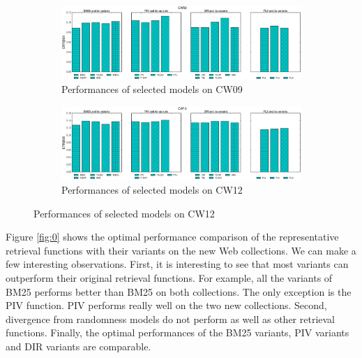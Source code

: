 \begin{figure}[t]
    \centering
    \caption{\label{fig:0}Optimal Performances on ClueWeb Collections}
    \begin{subfigure}[t]{1\textwidth}
        \includegraphics[width=\textwidth]{figures/CW09_bar.eps}
        \caption{Performances of selected models on CW09}
        \label{fig:cw09_bar}
    \end{subfigure}
    \begin{subfigure}[t]{1\textwidth}
        \includegraphics[width=\textwidth]{figures/CW12_bar.eps}
        \caption{Performances of selected models on CW12}
        \label{fig:cw12_bar}
    \end{subfigure}
    
\end{figure}

Figure \ref{fig:0} shows the optimal performance comparison of the 
representative retrieval functions with their variants on 
the new Web collections. We can make a few interesting observations. 
First, it is interesting to see that most variants can outperform 
their original retrieval functions.   For example, all the variants
of BM25 performs better than BM25 on both collections.  The only 
exception is the PIV function.  PIV performs really well on the 
two new collections. 
Second, divergence from randomness models do not perform as 
well as other retrieval functions.   Finally, the optimal 
performances of the BM25 variants, PIV variants and DIR 
variants are comparable.  



